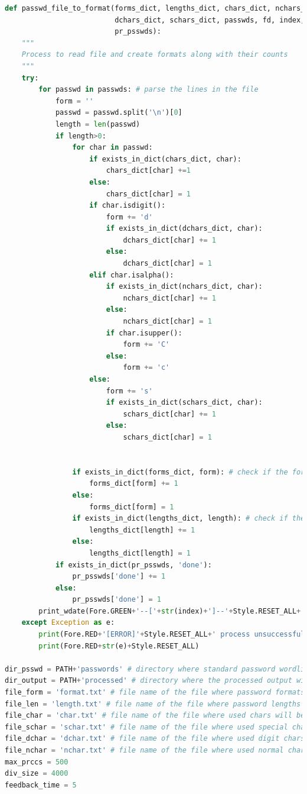 \documentclass[a4paper,12pt]{article}
\begin{document}
\begin{lstlisting}[language=Python]
def passwd_file_to_format(forms_dict, lengths_dict, chars_dict, nchars_dict,
                          dchars_dict, schars_dict, passwds, fd, index,
                          pr_psswds):
    """
    Process to read file and create formats along with their counts
    """
    try:
        for passwd in passwds: # parse the lines in the file
            form = ''
            passwd = passwd.split('\n')[0]
            length = len(passwd)
            if length>0:
                for char in passwd:
                    if exists_in_dict(chars_dict, char):
                        chars_dict[char] +=1
                    else:
                        chars_dict[char] = 1
                    if char.isdigit():
                        form += 'd'
                        if exists_in_dict(dchars_dict, char):
                            dchars_dict[char] += 1
                        else:
                            dchars_dict[char] = 1
                    elif char.isalpha():
                        if exists_in_dict(nchars_dict, char):
                            nchars_dict[char] += 1
                        else:
                            nchars_dict[char] = 1
                        if char.isupper():
                            form += 'C'
                        else:
                            form += 'c'
                    else:
                        form += 's'
                        if exists_in_dict(schars_dict, char):
                            schars_dict[char] += 1
                        else:
                            schars_dict[char] = 1
                        

                if exists_in_dict(forms_dict, form): # check if the format already exists in the dict
                    forms_dict[form] += 1
                else:
                    forms_dict[form] = 1
                if exists_in_dict(lengths_dict, length): # check if the length already exists in the dict
                    lengths_dict[length] += 1
                else:
                    lengths_dict[length] = 1
            if exists_in_dict(pr_psswds, 'done'):
                pr_psswds['done'] += 1
            else:
                pr_psswds['done'] = 1
        print_wdate(Fore.GREEN+'--['+str(index)+']--'+Style.RESET_ALL+'Finished process for', fd.name)
    except Exception as e:
        print(Fore.RED+'[ERROR]'+Style.RESET_ALL+' process unsuccessful')
        print(Fore.RED+str(e)+Style.RESET_ALL)

dir_psswd = PATH+'passwords' # directory where standard password wordlists are stored
dir_output = PATH+'processed' # directory where the processed output will be stored
file_form = 'format.txt' # file name of the file where password formats will be stored
file_len = 'length.txt' # file name of the file where password lengths will be stored
file_char = 'char.txt' # file name of the file where used chars will be stored
file_schar = 'schar.txt' # file name of the file where used special chars will be stored
file_dchar = 'dchar.txt' # file name of the file where used digit chars will be stored
file_nchar = 'nchar.txt' # file name of the file where used normal chars will be stored
max_prccs = 500
div_size = 4000
feedback_time = 5


\end{lstlisting}
\end{document}
